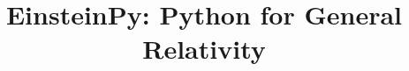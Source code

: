\documentclass{aastex63}
\begin{document}
\title{EinsteinPy: Python for General Relativity}



\end{document}
